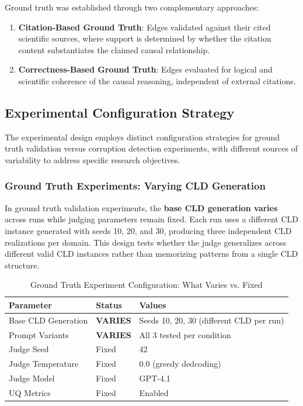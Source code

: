 \documentclass{article}
\begin{document}
Ground truth was established through two complementary approaches:
\begin{enumerate}
    \item \textbf{Citation-Based Ground Truth}: Edges validated against their cited scientific sources, where support is determined by whether the citation content substantiates the claimed causal relationship.
    \item \textbf{Correctness-Based Ground Truth}: Edges evaluated for logical and scientific coherence of the causal reasoning, independent of external citations.
\end{enumerate}

\subsection{Experimental Configuration Strategy}

The experimental design employs distinct configuration strategies for ground truth validation versus corruption detection experiments, with different sources of variability to address specific research objectives.

\subsubsection{Ground Truth Experiments: Varying CLD Generation}

In ground truth validation experiments, the \textbf{base CLD generation varies} across runs while judging parameters remain fixed. Each run uses a different CLD instance generated with seeds 10, 20, and 30, producing three independent CLD realizations per domain. This design tests whether the judge generalizes across different valid CLD instances rather than memorizing patterns from a single CLD structure.

\begin{table}[H]
\centering
\caption{Ground Truth Experiment Configuration: What Varies vs. Fixed}
\label{tab:gt_config}
\begin{tabular}{lll}
\toprule
\textbf{Parameter} & \textbf{Status} & \textbf{Values} \\
\midrule
Base CLD Generation & \textbf{VARIES} & Seeds 10, 20, 30 (different CLD per run) \\
Prompt Variants & \textbf{VARIES} & All 3 tested per condition \\
\midrule
Judge Seed & Fixed & 42 \\
Judge Temperature & Fixed & 0.0 (greedy dedcoding) \\
Judge Model & Fixed & GPT-4.1 \\
UQ Metrics & Fixed & Enabled \\
\bottomrule
\end{tabular}
\end{table}
\end{document}
